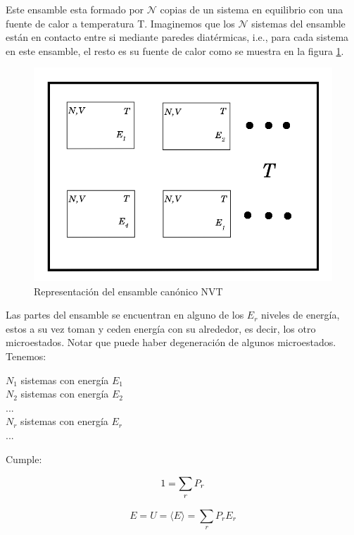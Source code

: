 Este ensamble esta formado por $\mathcal{N}$ copias de un sistema en equilibrio con una fuente de calor a temperatura T. Imaginemos que los $\mathcal{N}$ sistemas del ensamble están en contacto entre si mediante paredes diatérmicas, i.e., para cada sistema en este ensamble, el resto es su fuente de calor como se muestra en la figura \ref{fig:CanonicEns}.\\

\begin{figure}[!h]
    \centering
    \includegraphics[width=.55\textwidth,keepaspectratio=true]{EnsCanonico.png}
    \caption{Representación del ensamble canónico NVT \cite{belof2013alternative}}
    \label{fig:CanonicEns}
\end{figure}

\newpage

Las partes del ensamble se encuentran en alguno de los $E_r$ niveles de energía, estos a su vez toman y ceden energía con su alrededor, es decir, los otro microestados. Notar que puede haber degeneración de algunos microestados.\\

Tenemos:\\
\begin{center}
    $N_1$ sistemas con energía $E_1$\\
    $N_2$ sistemas con energía $E_2$\\
    ...\\
    $N_r$ sistemas con energía $E_r$\\
    ...\\
\end{center}


Cumple:

\begin{equation} \label{restrprob}
    1 = \sum_r P_r \\
\end{equation}

\begin{equation} \label{energiaprob}
    E = U = \langle E\rangle = \sum_r P_r E_r
\end{equation}


